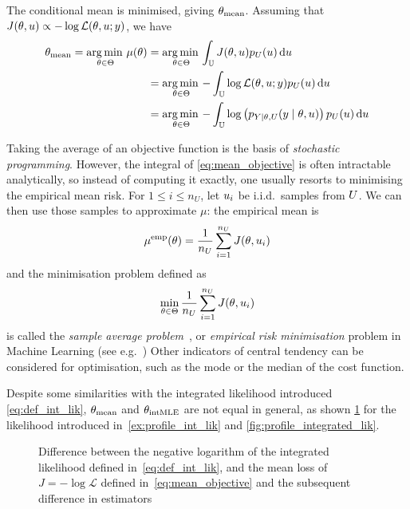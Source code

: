 \documentclass[../../Main_ManuscritThese.tex]{subfiles}
\newcommand\imgpath{/home/victor/acadwriting/Manuscrit/Text/Chapter3/img/}
\begin{document}
The conditional mean is minimised, giving
${\theta}_{\mathrm{mean}}$. Assuming that
$J(\theta, u) \propto - \log \mathcal{L}(\theta,u;y)$, we have
\begin{align}
  {\theta}_{\mathrm{mean}} = \operatorname*{arg\,min \,}_{\theta\in\Theta} \mu(\theta)&= \operatorname*{arg\,min \,}_{\theta\in\Theta}\int_{\mathbb{U}} J(\theta,u) p_{U}(u)\,\mathrm{d}u \\
                                                            &= \operatorname*{arg\,min \,}_{\theta\in\Theta} - \int_{\mathbb{U}} \log \mathcal{L}(\theta,u;y) p_{U}(u)\,\mathrm{d}u \\
                                                            &= \operatorname*{arg\,min \,}_{\theta\in\Theta} - \int_{\mathbb{U}}\log\left(p_{Y \mid \theta,U}(y \mid \theta,u)\right)p_{U}(u)\,\mathrm{d}u 
\end{align}

Taking the average of an objective function is the basis of
\emph{stochastic programming}.  However, the integral of
\cref{eq:mean_objective} is often intractable analytically, so instead
of computing it exactly, one usually resorts to minimising the
empirical mean risk. For $1\leq i \leq n_U$, let $u_i$ be i.i.d.\
samples from $U$. We can then use those samples to approximate
$\mu$: the empirical mean is
\begin{equation}
  \label{eq:emp_mean_objective}
  \mu^{\mathrm{emp}}(\theta) = \frac{1}{n_U}\sum_{i=1}^{n_U} J(\theta, u_i)
\end{equation}
and the minimisation problem defined as
\begin{equation}
  \min_{\theta\in\Theta} \frac{1}{n_U}\sum_{i=1}^{n_U} J(\theta, u_i)
\end{equation}
is called the \emph{sample average
  problem}~\citep{juditsky_stochastic_2009}, or \emph{empirical risk
  minimisation} problem in Machine Learning (see
e.g.~\cite{vapnik_principles_1992}) Other indicators of central
tendency can be considered for optimisation, such as the mode or the
median of the cost function.

Despite some similarities with the integrated likelihood introduced
\cref{eq:def_int_lik}, ${\theta}_{\mathrm{mean}}$ and
${\theta}_{\mathrm{intMLE}}$ are not equal in general, as shown
\cref{fig:difference_arithmetic_geometric_mean} for the likelihood
introduced in~\cref{ex:profile_int_lik} and
\cref{fig:profile_integrated_lik}.

\begin{figure}[ht]
  \centering
  
  \caption[Difference between integrated likelihood and mean
  loss]{\label{fig:difference_arithmetic_geometric_mean} Difference
    between the negative logarithm of the integrated likelihood
    defined in~\cref{eq:def_int_lik}, and the mean loss of
    $J = -\log \mathcal{L}$ defined in~\cref{eq:mean_objective} and the
    subsequent difference in estimators}
\end{figure}
\end{document}
